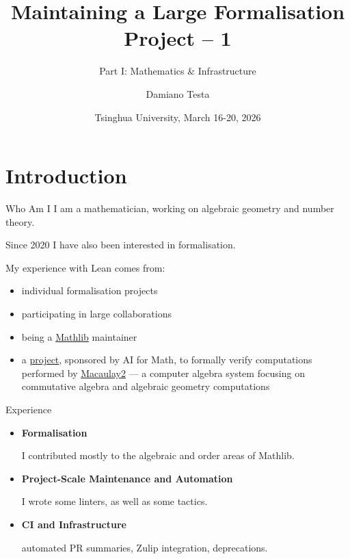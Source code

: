\documentclass{beamer}
\title[Maintaining a Large Formalisation Project 1]{Maintaining a Large Formalisation Project -- 1}
\subtitle{Part I: Mathematics \& Infrastructure}
\author{Damiano Testa}
\institute[Warwick]{University of Warwick}
\date{Tsinghua University, March 16-20, 2026}
\begin{document}
\begin{frame}
  \titlepage
\end{frame}

\section{Introduction}

\begin{frame}{Who Am I}
I am a mathematician, working on algebraic geometry and number theory.

\bigskip

Since 2020 I have also been interested in formalisation.

\bigskip

My experience with Lean comes from:

\medskip

\begin{itemize}
  \item individual formalisation projects
  \medskip
  \item participating in large collaborations
  \medskip
  \item being a \href{https://github.com/leanprover-community/mathlib}{Mathlib} maintainer
  \medskip
  \item a \href{https://www.renaissancephilanthropy.org/bridging-proof-and-computation-a-verified-leanmacaulay2-interface}{project}, sponsored by AI for Math, to formally verify computations performed by \href{https://macaulay2.com/}{Macaulay2} --- a computer algebra system focusing on commutative algebra and algebraic geometry computations
\end{itemize}
\end{frame}

\begin{frame}{Experience}
\begin{itemize}
  \item \textbf{Formalisation}

  I contributed mostly to the algebraic and order areas of Mathlib.
  \medskip
  \item \textbf{Project-Scale Maintenance and Automation}

  I wrote some linters, as well as some tactics.
  \medskip
  \item \textbf{CI and Infrastructure}

  automated PR summaries, Zulip integration, deprecations.
\end{itemize}
\end{frame}
\end{document}
